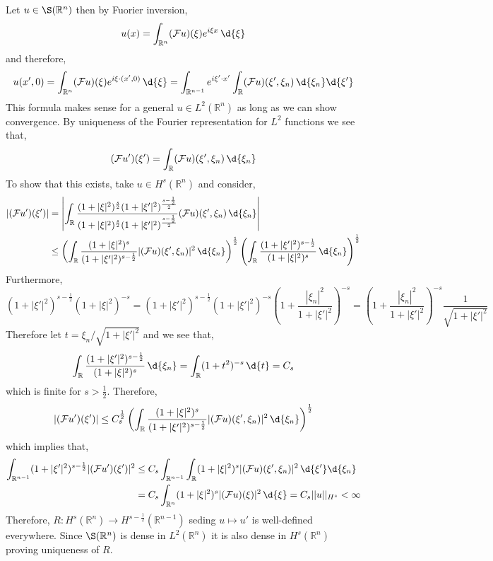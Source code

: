 \documentclass[12pt]{article}
\newcommand{\R}{\mathbb{R}}
\renewcommand{\F}{\mathcal{F}}
\begin{document}
Let $u \in \S(\R^n)$ then by Fuorier inversion,
\begin{align*}
u(x) = \int_{\R^n} (\F u)(\xi) e^{i \xi x} \, \d{\xi} 
\end{align*}
and therefore,
\[ u(x',0) = \int_{\R^n} (\F u)(\xi) e^{i \xi \cdot (x', 0)} \, \d{\xi} = \int_{\R^{n-1}} e^{i \xi' \cdot x'} \int_{\R} (\F u)(\xi', \xi_n) \, \d{\xi_n} \d{\xi'} \] 
This formula makes sense for a general $u \in L^2(\R^n)$ as long as we can show convergence. By uniqueness of the Fourier representation for $L^2$ functions we see that,
\[ (\F u')(\xi') = \int_{\R} (\F u)(\xi', \xi_n) \, \d{\xi_n} \]
To show that this exists, take $u \in H^s(\R^n)$ and consider,
\begin{align*}
|(\F u')(\xi')| & = \left| \int_{\R} \frac{(1 + |\xi|^2)^{\frac{s}{2}}(1 + |\xi'|^2)^{\frac{s - \frac{1}{2}}{2}}}{(1 + |\xi|^2)^{\frac{s}{2}}(1 + |\xi'|^2)^{\frac{s - \frac{1}{2}}{2}}} (\F u)(\xi', \xi_n) \, \d{\xi_n} \right| 
\\
& \le \left( \int_\R \frac{(1 + |\xi|^2)^s}{(1 + |\xi'|^2)^{s - \frac{1}{2}}} | (\F u)(\xi', \xi_n) |^2 \, \d{\xi_n} \right)^{\frac{1}{2}} \left( \int_\R \frac{(1 + |\xi'|^2)^{s - \frac{1}{2}}}{(1 + |\xi|^2)^{s}} \, \d{\xi_n} \right)^{\frac{1}{2}}
\end{align*}
Furthermore,
\[ (1 + |\xi'|^2)^{s - \frac{1}{2}} (1 + |\xi|^2)^{-s} = (1 + |\xi'|^2)^{s - \frac{1}{2}} (1 + |\xi'|^2)^{-s} \left( 1 + \frac{|\xi_n|^2}{1 + |\xi'|^2} \right)^{-s} = \left( 1 + \frac{|\xi_n|^2}{1 + |\xi'|^2} \right)^{-s} \frac{1}{\sqrt{1 + |\xi'|^2}} \]
Therefore let $t = \xi_n / \sqrt{1 + |\xi'|^2}$ and we see that,
\[ \int_\R \frac{(1 + |\xi'|^2)^{s - \frac{1}{2}}}{(1 + |\xi|^2)^{s}} \, \d{\xi_n}  = \int_\R (1 + t^2)^{-s} \, \d{t} = C_s \]
which is finite for $s > \frac{1}{2}$. Therefore,
\[ |(\F u')(\xi')| \le C_s^{\frac{1}{2}} \left( \int_\R \frac{(1 + |\xi|^2)^s}{(1 + |\xi'|^2)^{s - \frac{1}{2}}} | (\F u)(\xi', \xi_n) |^2 \, \d{\xi_n} \right)^{\frac{1}{2}}  \]
which implies that,
\begin{align*}
\int_{\R^{n-1}} (1 + |\xi'|^2)^{s- \frac{1}{2}} | (\F u')(\xi')|^2 & \le C_s \int_{\R^{n-1}} \int_\R (1 + |\xi|^2)^s |(\F u)(\xi',\xi_n)|^2 \, \d{\xi'} \d{\xi_n}
\\
& = C_s \int_{\R^n} (1 + |\xi|^2)^s |(\F u)(\xi)|^2 \, \d{\xi} = C_s || u ||_{H^s} < \infty
\end{align*}
Therefore, $R : H^s(\R^n) \to H^{s- \frac{1}{2}}(\R^{n-1})$ seding $u \mapsto u'$ is well-defined everywhere. Since $\S(\R^n)$ is dense in $L^2(\R^n)$ it is also dense in $H^s(\R^n)$ proving uniqueness of $R$.
\end{document}
